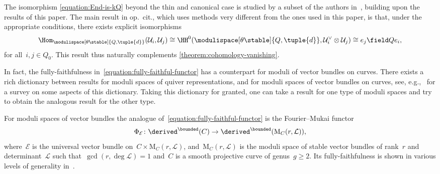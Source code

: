 The isomorphism \eqref{equation:End-is-kQ}
beyond the thin and canonical case
is studied by a subset of the authors in~\cite{MR4883104},
building upon the results of this paper.
The main result in op.~cit.,
which uses methods very different from the ones used in this paper,
is that,
under the appropriate conditions,
there exists explicit isomorphisms
\begin{equation*}
\Hom_{\modulispace[\theta\stable]{Q,\tuple{d}}}(\mathcal{U}_i,\mathcal{U}_j)
\cong
\HH^0(\modulispace[\theta\stable]{Q,\tuple{d}},\mathcal{U}_i^\vee\otimes\mathcal{U}_j)
\cong
e_j\field Qe_i,
\end{equation*}
for all~$i,j\in Q_0$.
This result thus naturally complements \cref{theorem:cohomology-vanishing}.

In fact, the fully-faithfulness in~\eqref{equation:fully-faithful-functor}
has a counterpart for moduli of vector bundles on curves.
There exists a rich dictionary between
results for moduli spaces of quiver representations,
and for moduli spaces of vector bundles on curves,
see, e.g.,~\cite{MR3882963} for a survey on some aspects of this dictionary.
Taking this dictionary for granted,
one can take a result for one type of moduli spaces
and try to obtain the analogous result for the other type.

For moduli spaces of vector bundles
the analogue of~\eqref{equation:fully-faithful-functor}
is the Fourier--Mukai functor
\begin{equation*}
\Phi_{\mathcal{E}}\colon\derived^\bounded(C)\to\derived^\bounded(\mathrm{M}_C(r,\mathcal{L})),
\end{equation*}
where~$\mathcal{E}$ is the universal vector bundle on~$C\times\mathrm{M}_C(r,\mathcal{L})$,
and~$\mathrm{M}_C(r,\mathcal{L})$ is the moduli space of
stable vector bundles of rank~$r$ and determinant~$\mathcal{L}$
such that~$\gcd(r,\deg\mathcal{L})=1$
and~$C$ is a smooth projective curve of genus~$g\geq 2$.
Its fully-faithfulness is shown in various levels of generality in~\cite{MR3764066,MR3954042,MR3713871,MR4651618}.

